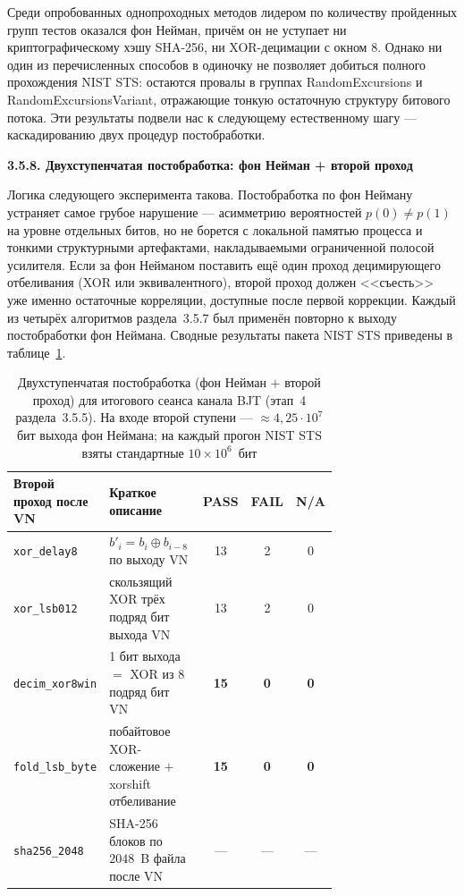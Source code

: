 Среди опробованных однопроходных методов лидером по количеству пройденных групп
тестов оказался фон Нейман, причём он не уступает ни криптографическому хэшу
SHA-256, ни XOR-децимации с окном 8. Однако ни один из перечисленных способов в
одиночку не позволяет добиться полного прохождения NIST STS: остаются провалы в
группах RandomExcursions и RandomExcursionsVariant, отражающие тонкую остаточную
структуру битового потока. Эти результаты подвели нас к следующему естественному
шагу --- каскадированию двух процедур постобработки.

\textbf{3.5.8. Двухступенчатая постобработка: фон Нейман + второй проход}

Логика следующего эксперимента такова. Постобработка по фон Нейману устраняет
самое грубое нарушение --- асимметрию вероятностей $p(0)\neq p(1)$ на уровне
отдельных битов, но не борется с локальной памятью процесса и тонкими структурными
артефактами, накладываемыми ограниченной полосой усилителя. Если за фон Нейманом
поставить ещё один проход децимирующего отбеливания (XOR или эквивалентного),
второй проход должен <<съесть>> уже именно остаточные корреляции, доступные после
первой коррекции. Каждый из четырёх алгоритмов раздела~3.5.7 был применён повторно
к выходу постобработки фон Неймана. Сводные результаты пакета NIST STS
приведены в таблице~\ref{tab:bjt_postproc_after_vn}.

\begin{table}[htbp]
  \centering
  \footnotesize
  \caption{Двухступенчатая постобработка (фон Нейман $+$ второй проход) для
  итогового сеанса канала BJT (этап~4 раздела~3.5.5). На входе второй
  ступени --- $\approx 4{,}25\cdot 10^7$ бит выхода фон Неймана; на каждый
  прогон NIST STS взяты стандартные $10\times 10^6$~бит}
  \label{tab:bjt_postproc_after_vn}
  \begin{tabular}{|p{0.30\linewidth}|p{0.42\linewidth}|c|c|c|}
    \hline
    Второй проход после VN & Краткое описание & PASS & FAIL & N/A \\
    \hline
    \texttt{xor\_delay8} & $b'_i = b_i\oplus b_{i-8}$ по выходу VN & 13 & 2 & 0 \\
    \hline
    \texttt{xor\_lsb012} & скользящий XOR трёх подряд бит выхода VN & 13 & 2 & 0 \\
    \hline
    \texttt{decim\_xor8win} & 1 бит выхода $=$ XOR из 8 подряд бит VN & \textbf{15} & \textbf{0} & \textbf{0} \\
    \hline
    \texttt{fold\_lsb\_byte} & побайтовое XOR-сложение $+$ xorshift отбеливание & \textbf{15} & \textbf{0} & \textbf{0} \\
    \hline
    \texttt{sha256\_2048} & SHA-256 блоков по $2048$~B файла после VN & --- & --- & --- \\
    \hline
  \end{tabular}
\end{table}

